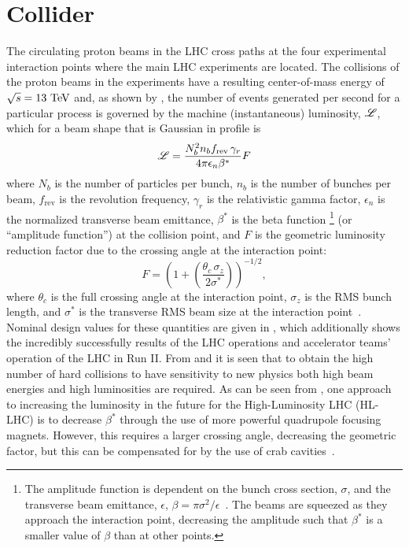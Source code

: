 \section{Collider}\label{section:LHC_collider}

The circulating proton beams in the LHC cross paths at the four experimental interaction points where the main LHC experiments are located.
The collisions of the proton beams in the experiments have a resulting center-of-mass energy of $\sqrt{s} = 13~\mathrm{TeV}$ and, as shown by , the number of events generated per second for a particular process is governed by the machine (instantaneous) luminosity, $\mathscr{L}$, which for a beam shape that is Gaussian in profile is
\begin{equation}
 \mathscr{L} = \frac{N_{b}^{2} n_{b} f_{\mathrm{rev}} \,\gamma_{r}}{4 \pi \epsilon_{n} \beta^{*}} F
 \label{eq:machine_luminosity}
\end{equation}
where $N_{b}$ is the number of particles per bunch, $n_{b}$ is the number of bunches per beam, $f_{\mathrm{rev}}$ is the revolution frequency, $\gamma_{r}$ is the relativistic gamma factor, $\epsilon_{n}$ is the normalized transverse beam emittance, $\beta^{*}$ is the beta function%
\footnote{The amplitude function is dependent on the bunch cross section, $\sigma$, and the transverse beam emittance, $\epsilon$, $\beta = \pi \sigma^{2}/\epsilon$~\cite{PDG2018:Ch30}.
 The beams are squeezed as they approach the interaction point, decreasing the amplitude such that $\beta^{*}$ is a smaller value of $\beta$ than at other points.}
(or ``amplitude function'') at the collision point, and $F$ is the geometric luminosity reduction factor due to the crossing angle at the interaction point:
\[
 F = \left(1 + \left(\frac{\theta_{c} \,\sigma_{z}}{2 \sigma^{*}}\right)\right)^{-1/2},
\]
where $\theta_{c}$ is the full crossing angle at the interaction point, $\sigma_{z}$ is the RMS bunch length, and $\sigma^{*}$ is the transverse RMS beam size at the interaction point~\cite{Evans:2008}.
Nominal design values for these quantities are given in , which additionally shows the incredibly successfully results of the LHC operations and accelerator teams' operation of the LHC in Run II.
From  and  it is seen that to obtain the high number of hard collisions to have sensitivity to new physics both high beam energies and high luminosities are required.
As can be seen from , one approach to increasing the luminosity in the future for the High-Luminosity LHC (HL-LHC) is to decrease $\beta^{*}$ through the use of more powerful quadrupole focusing magnets.
However, this requires a larger crossing angle, decreasing the geometric factor, but this can be compensated for by the use of crab cavities~\cite{PhysRevAccelBeams.19.101003}.

